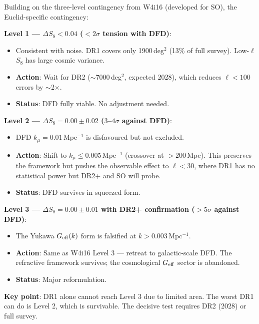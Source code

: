 \documentclass[11pt,a4paper]{article}
\newcommand{\kmu}{k_\mu}
\newcommand{\Geff}{G_{\rm eff}}
\begin{document}
\begin{contigbox}

Building on the three-level contingency from W4i16 (developed for SO),
the Euclid-specific contingency:

\textbf{Level 1 --- $\Delta S_8 < 0.04$ ($< 2\sigma$ tension with DFD)}:
\begin{itemize}[nosep]
\item Consistent with noise. DR1 covers only 1900\,deg$^2$ (13\% of
  full survey). Low-$\ell$ $S_8$ has large cosmic variance.
\item \textbf{Action}: Wait for DR2 ($\sim$7000\,deg$^2$, expected 2028),
  which reduces $\ell < 100$ errors by $\sim$2$\times$.
\item \textbf{Status}: DFD fully viable. No adjustment needed.
\end{itemize}

\textbf{Level 2 --- $\Delta S_8 = 0.00 \pm 0.02$ ($3$--$4\sigma$ against DFD)}:
\begin{itemize}[nosep]
\item DFD $\kmu = 0.01$\,Mpc$^{-1}$ is disfavoured but not excluded.
\item \textbf{Action}: Shift to $\kmu \leq 0.005$\,Mpc$^{-1}$ (crossover
  at $> 200$\,Mpc). This preserves the framework but pushes the observable
  effect to $\ell < 30$, where DR1 has no statistical power but DR2+
  and SO will probe.
\item \textbf{Status}: DFD survives in squeezed form.
\end{itemize}

\textbf{Level 3 --- $\Delta S_8 = 0.00 \pm 0.01$ with DR2+ confirmation
  ($> 5\sigma$ against DFD)}:
\begin{itemize}[nosep]
\item The Yukawa $\Geff(k)$ form is falsified at $k > 0.003$\,Mpc$^{-1}$.
\item \textbf{Action}: Same as W4i16 Level 3 --- retreat to galactic-scale
  DFD. The refractive framework survives; the cosmological $\Geff$
  sector is abandoned.
\item \textbf{Status}: Major reformulation.
\end{itemize}

\textbf{Key point}: DR1 alone cannot reach Level 3 due to limited area.
The worst DR1 can do is Level 2, which is survivable. The decisive test
requires DR2 (2028) or full survey.

\end{contigbox}
\end{document}
